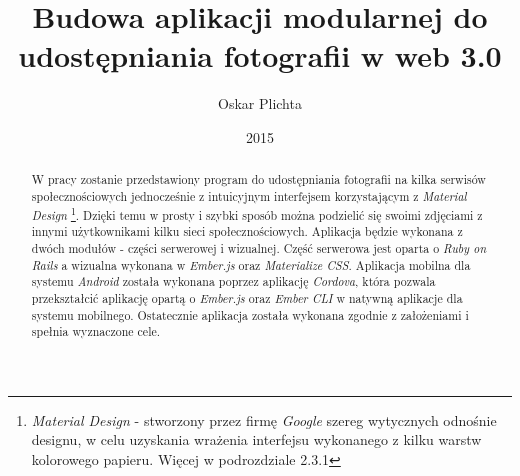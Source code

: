 \documentclass[openright]{xmgr}
\author   {Oskar Plichta}
\title    {Budowa aplikacji modularnej do udostępniania fotografii  w web 3.0}
\date     {2015}
\begin{document}
\begin{abstract}
W pracy zostanie przedstawiony program do udostępniania fotografii na kilka serwisów społecznościowych jednocześnie z intuicyjnym interfejsem korzystającym z \textit{Material Design} \footnote{\textit{Material Design} - stworzony przez firmę \textit{ Google} szereg wytycznych odnośnie designu, w celu uzyskania wrażenia interfejsu wykonanego z kilku warstw kolorowego papieru. Więcej w podrozdziale 2.3.1}. Dzięki temu w prosty i szybki sposób można podzielić się swoimi zdjęciami z innymi użytkownikami kilku sieci społecznościowych. Aplikacja będzie wykonana z dwóch modułów - części serwerowej i wizualnej. Część serwerowa jest oparta o \textit{Ruby on Rails} a wizualna wykonana w \textit{Ember.js} oraz \textit{Materialize CSS}. Aplikacja mobilna dla systemu \textit{Android}  została wykonana poprzez aplikację \textit{Cordova}, która pozwala przekształcić aplikację opartą o \textit{Ember.js} oraz \textit{Ember CLI} w natywną aplikacje dla systemu mobilnego. Ostatecznie aplikacja została wykonana zgodnie z założeniami i spełnia wyznaczone cele.

\end{abstract}
\end{document}
